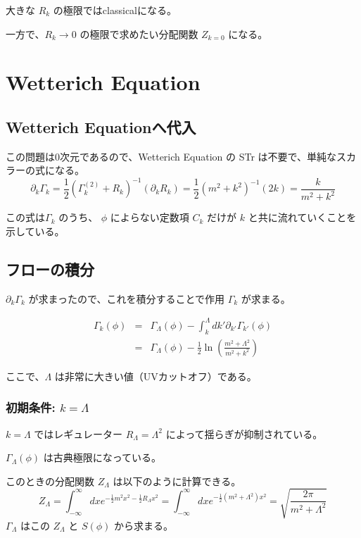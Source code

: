\documentclass[uplatex,a4j,12pt,dvipdfmx]{jsarticle}
\begin{document}
大きな $R_{k}$ の極限ではclassicalになる。

一方で、$R_{k} \to 0$ の極限で求めたい分配関数 $Z_{k=0}$ になる。
\section{Wetterich Equation}

\subsection{Wetterich Equationへ代入}

この問題は0次元であるので、Wetterich Equation の STr は不要で、単純なスカラーの式になる。
\[
	\partial_k \Gamma_k = \frac{1}{2} ( \Gamma_k^{(2)} + R_k )^{-1} (\partial_k R_k)
	= \frac{1}{2} ( m^2 + k^2 )^{-1} (2k)
	= \frac{k}{m^2+k^2}
\]

この式は$\Gamma_k$ のうち、
$\phi$ によらない定数項 $C_k$ だけが $k$ と共に流れていくことを示している。

\subsection{フローの積分}

$\partial_k \Gamma_k$ が求まったので、これを積分することで作用 $\Gamma_{k}$ が求まる。

\[
	\begin{array}{rcl}
		\Gamma_{k}(\phi) & = & \displaystyle \Gamma_{\Lambda} (\phi) - \int^{\Lambda}_{k} dk' \partial_{k'} \Gamma_{k'}(\phi)                 \\
		                 & = & \displaystyle \Gamma_{\Lambda} (\phi) - \frac{1}{2} \ln \left( \frac{m^{2} + \Lambda^{2}}{m^{2}+k^{2}} \right)
	\end{array}
\]

ここで、$\Lambda$ は非常に大きい値（UVカットオフ）である。

\subsubsection{初期条件: $k=\Lambda$}

$k=\Lambda$ ではレギュレーター $R_{\Lambda} = \Lambda^{2}$ によって揺らぎが抑制されている。

$\Gamma_{\Lambda} (\phi)$ は古典極限になっている。

このときの分配関数 $Z_{\Lambda}$ は以下のように計算できる。
\[
	Z_{\Lambda} =
	\int^{\infty}_{- \infty} dx e^{ -\frac{1}{2} m^{2} x^{2} - \frac{1}{2} R_{\Lambda} x^{2} }
	=
	\int^{\infty}_{- \infty} dx e^{ -\frac{1}{2} (m^{2} + \Lambda^2) x^{2} }
	=
	\sqrt{ \frac{2 \pi}{m^{2} + \Lambda^2} }
\]
$\Gamma_\Lambda$ はこの $Z_\Lambda$ と $S(\phi)$ から求まる。
\end{document}
